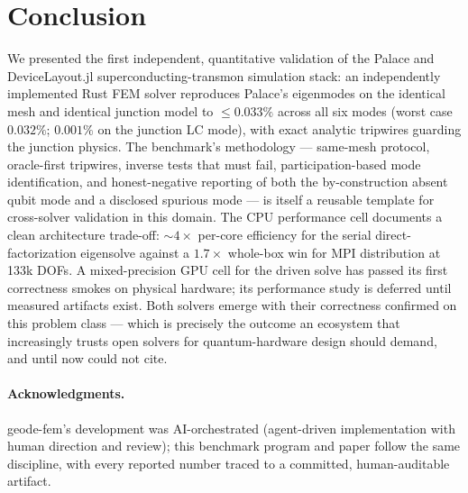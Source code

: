 \documentclass{anvil-paper}
\begin{document}
\section{Conclusion}
\label{sec:conclusion}

We presented the first independent, quantitative validation of the
Palace and DeviceLayout.jl superconducting-transmon simulation stack: an
independently implemented Rust FEM solver reproduces Palace's eigenmodes on
the identical mesh and identical junction model to $\leq 0.033\%$ across
all six modes (worst case $0.032\%$; $0.001\%$ on the junction LC mode),
with exact analytic tripwires guarding the junction physics. The
benchmark's methodology --- same-mesh protocol, oracle-first tripwires,
inverse tests that must fail, participation-based mode identification, and
honest-negative reporting of both the by-construction absent qubit mode
and a disclosed spurious mode --- is itself a reusable template for
cross-solver validation in this domain. The CPU performance cell documents
a clean architecture trade-off: ${\sim}4\times$ per-core efficiency for
the serial direct-factorization eigensolve against a $1.7\times$ whole-box
win for MPI distribution at 133k DOFs. A mixed-precision GPU cell for the
driven solve has passed its first correctness smokes on physical hardware;
its performance study is deferred until measured artifacts exist. Both
solvers emerge with their correctness confirmed on this problem class ---
which is precisely the outcome an ecosystem that increasingly trusts open
solvers for quantum-hardware design should demand, and until now could not
cite.

\paragraph{Acknowledgments.}
geode-fem's development was AI-orchestrated (agent-driven implementation
with human direction and review); this benchmark program and paper follow
the same discipline, with every reported number traced to a committed,
human-auditable artifact.



\end{document}
